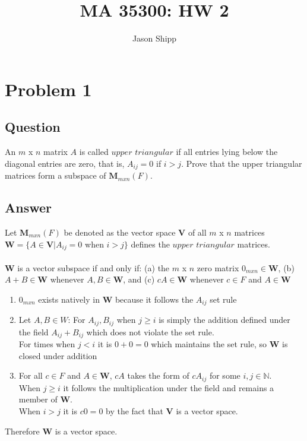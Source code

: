 \documentclass{article}
\begin{document}
\title{MA 35300: HW 2}
\author{Jason Shipp}
\maketitle
\section*{Problem 1}
\subsection*{Question}
An \(m\) x \(n\) matrix \(A\) is called \(upper\) \(triangular\) if all entries lying below the diagonal entries are zero, that is, \(A_{ij} = 0\) if \( i > j\). Prove that the upper triangular matrices form a subspace of \(\textbf{M}_{m x n}(F)\).
\subsection*{Answer}
Let \(\textbf{M}_{m x n}(F)\) be denoted as the vector space \(\textbf{V}\) of all \(m\) x \(n\) matrices
\\ \(\textbf{W} = \{ A \in \textbf{V} | A_{ij} = 0\) when \(i > j \}\) defines the \(upper\) \(triangular\) matrices.
\\ \\ \(\textbf{W}\) is a vector subspace if and only if: (a) the \(m\) x \(n\) zero matrix \(0_{m x n} \in \textbf{W}\), (b) \(A + B \in \textbf{W}\) whenever \(A, B \in \textbf{W}\), and (c) \(cA \in \textbf{W}\) whenever \(c \in F\) and \(A \in \textbf{W}\)
\begin{enumerate}[label=\alph*]
\item \(0_{m x n}\) exists natively in \(\textbf{W}\) because it follows the \(A_{ij}\) set rule
\item Let \(A, B \in W\): For \(A_{ij}, B_{ij}\) when \(j \geq i\) is simply the addition defined under the field \(A_{ij} + B_{ij}\) which does not violate the set rule. \\ For times when \(j < i\) it is \(0 + 0 = 0\) which maintains the set rule, so \(\textbf{W}\) is closed under addition
\item For all \(c \in F\) and \(A \in \textbf{W}\), \(cA\) takes the form of \(cA_{ij}\) for some \(i, j \in \mathbb{N}\). \\ When \(j \geq i\) it follows the multiplication under the field and remains a member of \(\textbf{W}\). \\ When \(i > j\) it is \(c0 = 0\) by the fact that \(\textbf{V}\) is a vector space. 
\end{enumerate}
Therefore \(\textbf{W}\) is a vector space. 
\end{document}
